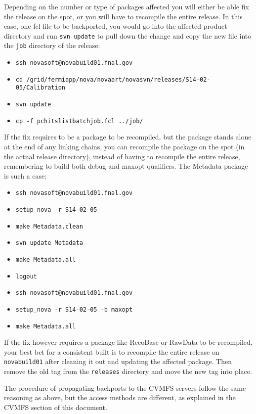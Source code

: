 \documentclass[letterpaper,10pt]{article}
\begin{document}
Depending on the number or type of packages affected you will either be able fix the release on the spot, or you will have to recompile the entire release. In this case, one fcl file to be backported, you would go into the affected product directory and run \verb|svn update| to pull down the change and copy the new file into the \verb|job| directory of the release:
\begin{itemize}
\item \verb|ssh novasoft@novabuild01.fnal.gov|
\item \verb|cd /grid/fermiapp/nova/novaart/novasvn/releases/S14-02-05/Calibration|
\item \verb|svn update|
\item \verb|cp -f pchitslistbatchjob.fcl ../job/|
\end{itemize}

If the fix requires to be a package to be recompiled, but the package stands alone at the end of any linking chains, you can recompile the package on the spot (in the actual release directory), instead of having to recompile the entire release, remembering to build both debug and maxopt qualifiers. The Metadata package is such a case:
\begin{itemize}
\item \verb|ssh novasoft@novabuild01.fnal.gov|
\item \verb|setup_nova -r S14-02-05|
\item \verb|make Metadata.clean|
\item \verb|svn update Metadata|
\item \verb|make Metadata.all|
\item \verb|logout|
\item \verb|ssh novasoft@novabuild01.fnal.gov|
\item \verb|setup_nova -r S14-02-05 -b maxopt|
\item \verb|make Metadata.all|
\end{itemize}

If the fix however requires a package like RecoBase or RawData to be recompiled, your best bet for a consistent built is to recompile the entire release on \verb|novabuild01| after cleaning it out and updating the affected package. Then remove the old tag from the \verb|releases| directory and move the new tag into place.

The procedure of propagating backports to the CVMFS servers follow the same reasoning as above, but the access methods are different, as explained in the CVMFS section of this document.
\end{document}
